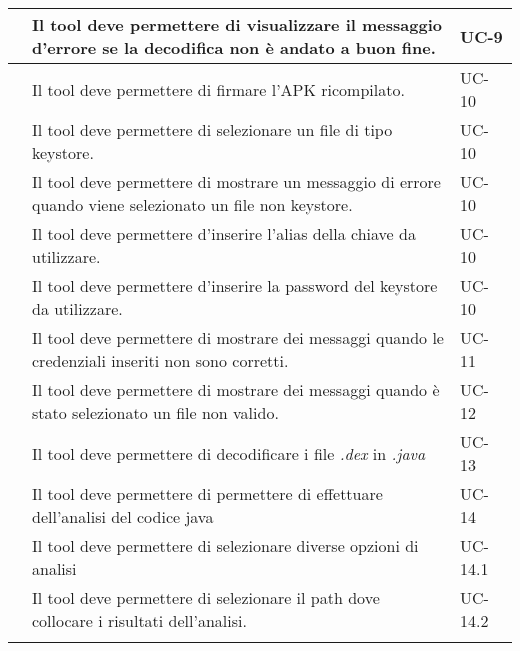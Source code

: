 \begin{longtable}{ | c| C{7cm} |C{3cm} |}
           & Il tool deve permettere di visualizzare il messaggio d'errore se la decodifica non è andato a buon fine.              & UC-9           \\\hline

           & Il tool deve permettere di firmare l'APK ricompilato.                                                                 & UC-10          \\\hline
        & Il tool deve permettere di selezionare un file di tipo keystore.                                                      & UC-10          \\\hline
        & Il tool deve permettere di mostrare un messaggio di errore quando viene selezionato un file non keystore.             & UC-10          \\\hline
        & Il tool deve permettere d'inserire l'alias della chiave da utilizzare.                                                & UC-10          \\\hline
        & Il tool deve permettere d'inserire la password del keystore da utilizzare.                                            & UC-10          \\\hline
    \setcounter{subCount}{0}

           & Il tool deve permettere di mostrare dei messaggi quando le credenziali inseriti non sono corretti.                    & UC-11          \\\hline
           & Il tool deve permettere di mostrare dei messaggi quando è stato selezionato un file non valido.                       & UC-12          \\\hline
           & Il tool deve permettere di decodificare i file \textit{.dex} in \textit{.java}                                        & UC-13          \\\hline
           & Il tool deve permettere di permettere di effettuare dell'analisi del codice java                                      & UC-14          \\\hline
        & Il tool deve permettere di selezionare diverse opzioni di analisi                                                     & UC-14.1        \\\hline
        & Il tool deve permettere di selezionare il path dove collocare i risultati dell'analisi.                               & UC-14.2        \\\hline
    \setcounter{subCount}{0}


\end{longtable}
